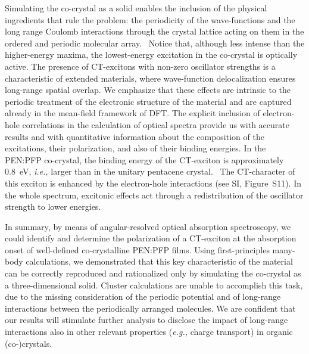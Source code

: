 \documentclass[journal=jpclcd,manuscript=letter]{achemso}
\begin{document}
Simulating the co-crystal as a solid enables the inclusion of the physical ingredients that rule the problem: the periodicity of the wave-functions and the long range Coulomb interactions through the crystal lattice acting on them in the ordered and periodic molecular array.~\cite{guer+21jpcc}
Notice that, although less intense than the higher-energy maxima, the lowest-energy excitation in the co-crystal is optically active.
The presence of CT-excitons with non-zero oscillator strengths is a characteristic of extended materials, where wave-function delocalization ensures long-range spatial overlap.
We emphasize that these effects are intrinsic to the periodic treatment of the electronic structure of the material and are captured already in the mean-field framework of DFT. 
The explicit inclusion of electron-hole correlations in the calculation of optical spectra provide us with accurate results and with quantitative information about the composition of the excitations, their polarization, and also of their binding energies.
In the PEN:PFP co-crystal, the binding energy of the CT-exciton is approximately 0.8~eV, \textit{i.e.,} larger than in the unitary pentacene crystal.~\cite{cocc+18pccp}
The CT-character of this exciton is enhanced by the electron-hole interactions (see SI, Figure~S11).
In the whole spectrum, excitonic effects act through a redistribution of the oscillator strength to lower energies. 

In summary, by means of angular-resolved optical absorption spectroscopy, we could identify and determine the polarization of a CT-exciton at the absorption onset of well-defined co-crystalline PEN:PFP films.
Using first-principles many-body calculations, we demonstrated that this key characteristic of the material can be correctly reproduced and rationalized only by simulating the co-crystal as a three-dimensional solid.
Cluster calculations are unable to accomplish this task, due to the missing consideration of the periodic potential and of long-range interactions between the periodically arranged molecules. 
We are confident that our results will stimulate further analysis to disclose the impact of long-range interactions also in other relevant properties (\textit{e.g.,} charge transport) in organic (co-)crystals.

\end{document}
